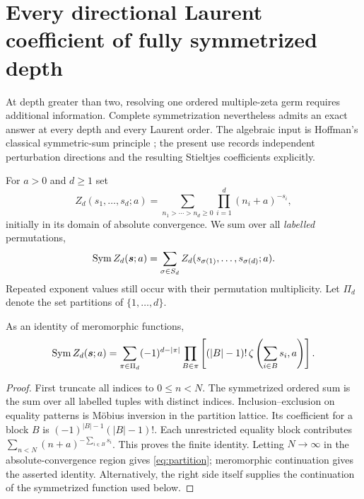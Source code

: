 \section{Every directional Laurent coefficient of fully symmetrized depth}
\label{sec:symmetric}

At depth greater than two, resolving one ordered multiple-zeta germ
requires additional information. Complete symmetrization nevertheless
admits an exact answer at every depth and every Laurent order. The
algebraic input is Hoffman's classical symmetric-sum principle
\cite{hoffman}; the present use records independent perturbation
directions and the resulting Stieltjes coefficients explicitly.

For $a>0$ and $d\ge1$ set
\[
 Z_d(s_1,\ldots,s_d;a)
   =\sum_{n_1>\cdots>n_d\ge0}\prod_{i=1}^d(n_i+a)^{-s_i},
\]
initially in its domain of absolute convergence. We sum over all
\emph{labelled} permutations,
\[
 \operatorname{Sym} Z_d(\boldsymbol s;a)
   =\sum_{\sigma\in S_d}Z_d(s_{\sigma(1)},\ldots,s_{\sigma(d)};a).
\]
Repeated exponent values still occur with their permutation
multiplicity. Let $\Pi_d$ denote the set partitions of $\{1,\ldots,d\}$.

\begin{proposition}\label{prop:partition}
As an identity of meromorphic functions,
\begin{equation}\label{eq:partition}
 \operatorname{Sym} Z_d(\boldsymbol s;a)
 =\sum_{\pi\in\Pi_d}(-1)^{d-|\pi|}
      \prod_{B\in\pi}\left[(|B|-1)!\,
                \zeta\left(\sum_{i\in B}s_i,a\right)\right].
\end{equation}
\end{proposition}
\begin{proof}
First truncate all indices to $0\le n<N$. The symmetrized ordered
sum is the sum over all labelled tuples with distinct indices.
Inclusion--exclusion on equality patterns is M\"obius inversion in the
partition lattice. Its coefficient for a block $B$ is
$(-1)^{|B|-1}(|B|-1)!$. Each unrestricted equality block contributes
$\sum_{n<N}(n+a)^{-\sum_{i\in B}s_i}$. This proves the finite identity.
Letting $N\to\infty$ in the absolute-convergence region gives
\eqref{eq:partition}; meromorphic continuation gives the asserted
identity. Alternatively, the right side itself supplies the
continuation of the symmetrized function used below.
\end{proof}

